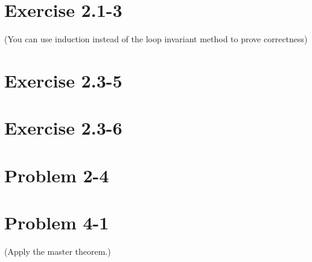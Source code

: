 \documentclass[letterpaper, 11pt]{article}
\begin{document}
\section{Exercise 2.1-3} %
 (You can use induction instead of the loop invariant method to prove correctness)

\section{Exercise 2.3-5}

\section{Exercise 2.3-6}

\section{Problem 2-4}

\section{Problem 4-1}  %
 (Apply the master theorem.)
\end{document}

